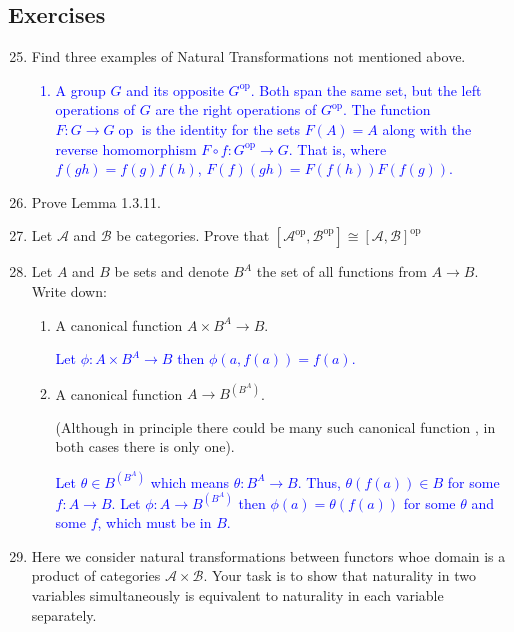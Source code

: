 \documentclass[12pt,a4paper]{report}
\newcommand{\BLUE}[1]{\textcolor{blue}{#1}}
\newcommand{\OP}{{\operatorname{op}}}
\newcommand{\CAT}[1]{\mathscr{#1}}
\begin{document}
\subsection{Exercises}

\begin{enumerate}[label=1.3.\arabic*]
\setcounter{enumi}{24}
\item Find three examples of Natural Transformations not mentioned above.

\BLUE{\begin{enumerate}
	\item A group $G$ and its opposite $G^\OP$.  Both span the same set, but the left operations of $G$ are the right operations of $G^\OP$.  The function $F: G \to G\OP$ is the identity for the sets $F(A) = A$ along with the reverse homomorphism $F\circ f: G^\OP \to G$.  That is, where $f(gh)=f(g)f(h)$, $F(f)(gh)=F(f(h))F(f(g))$.
\end{enumerate}
}

\item Prove Lemma 1.3.11.

\item Let $\CAT{A}$ and $\CAT{B}$ be categories. Prove that $[\CAT{A}^\OP, \CAT{B}^\OP]\cong [\CAT{A},\CAT{B}]^\OP$

\item Let $A$ and $B$ be sets and denote $B^A$ the set of all functions from $A \to B$.  Write down:
\begin{enumerate}[label=(\alph*)]

\item A canonical function $A \times B^A \to B$.

\BLUE{Let $\phi: A \times B^A \to B$ then $\phi(a, f(a)) = f(a)$.
}

\item A canonical function $A \to B^{(B^A)}$.

(Although in principle there could be many such canonical function	, in both cases there is only one).

\BLUE{Let $\theta \in B^{(B^A)}$ which means $\theta: B^A \to B$.  Thus, $\theta(f(a)) \in B$ for some $f: A \to B$.  Let $\phi: A \to B^{(B^A)}$ then $\phi(a) = \theta(f(a))$ for some $\theta$ and some $f$, which must be in $B$.
}

\end{enumerate}

\item Here we consider natural transformations between functors whoe domain is a product of categories $\CAT{A}\times \CAT{B}$.  Your task is to show that naturality in two variables simultaneously is equivalent to naturality in each variable separately.


\end{enumerate}
\end{document}
